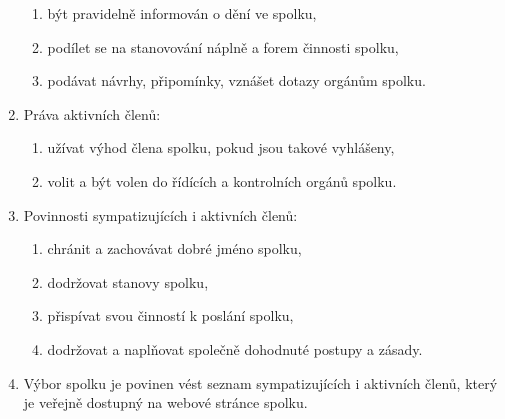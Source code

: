 \documentclass[11pt,a4paper]{article}
\begin{document}
\begin{enumerate}[itemsep=0pt]
\begin{enumerate}[itemsep=0pt,topsep=0pt]
        \item být pravidelně informován o dění ve spolku,
        \item podílet se na stanovování náplně a forem činnosti spolku,
        \item podávat návrhy, připomínky, vznášet dotazy orgánům spolku.
    \end{enumerate}
    \item Práva aktivních členů:
    \begin{enumerate}[itemsep=0pt,topsep=0pt]
        \item užívat výhod člena spolku, pokud jsou takové vyhlášeny,
        \item volit a být volen do řídících a kontrolních orgánů spolku.
    \end{enumerate}
    \item Povinnosti sympatizujících i aktivních členů:
    \begin{enumerate}[itemsep=0pt,topsep=0pt]
        \item chránit a zachovávat dobré jméno spolku,
        \item dodržovat stanovy spolku,
        \item přispívat svou činností k poslání spolku,
        \item dodržovat a naplňovat společně dohodnuté postupy a zásady.
    \end{enumerate}
    \item Výbor spolku je povinen vést seznam sympatizujících i aktivních členů,
    který je veřejně dostupný na webové stránce spolku. 
\end{enumerate}
\end{document}
